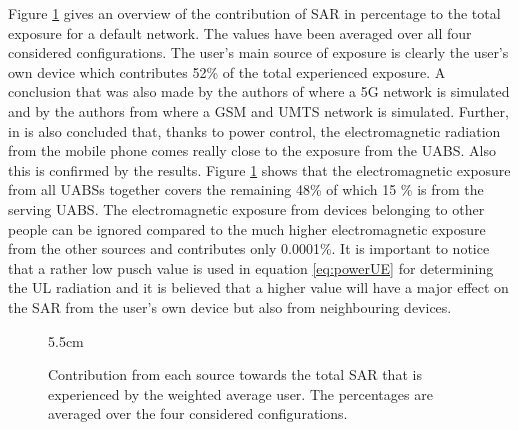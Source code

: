 Figure \ref{fig:pie} gives
an overview of the contribution of \gls{SAR} in percentage to the total 
exposure for a default network. The values have been averaged over all four considered configurations. 
The user's main source of exposure is clearly the user's own device which contributes 52\% of the total experienced exposure.
A conclusion that was also made by the authors of \cite{J17_kuehn2019modelling}
where a 5G network is simulated and by the authors from  \cite{J10.1.1} 
where a \gls{GSM} and \gls{UMTS} network is simulated. Further, in \cite{J10.1.1} is also concluded that,
thanks to power control, the electromagnetic radiation from the mobile phone 
comes really close to the exposure from the \gls{UABS}. 
Also this is confirmed by the results. Figure \ref{fig:pie} shows that the electromagnetic exposure 
from all \gls{UABS}s together covers the remaining 48\% of which 15 \% is from the serving UABS. 
The electromagnetic
 exposure from devices belonging to other people can be ignored compared to the much higher electromagnetic exposure from the other sources
 and contributes only 0.0001\%. It is important to notice that a rather low \gls{pusch} value is used in equation \ref{eq:powerUE} for determining the 
 \gls{UL} radiation and it is believed that a higher value will have a major effect on the \gls{SAR} from the user's own 
 device but also from neighbouring devices.

\def\angle{0}
\def\radius{3}
\def\cyclelist{{"c_myue","c_otheruabs","c_myuabs","c_otherue"}}
\newcount\cyclecount {}
\newcount\ind {}
\begin{figure}
\centering
 \resizebox {!} {5.5cm} {
 }
\caption{Contribution from each source towards the total SAR that is experienced by the weighted average user. 
The percentages are averaged over the four 
considered configurations.}
\label{fig:pie}
\end{figure}

